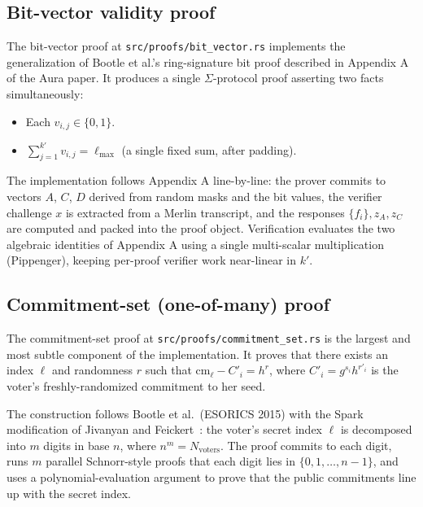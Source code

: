 \documentclass[12pt,a4paper,oneside]{report}
\begin{document}
\subsection{Bit-vector validity proof}
\label{sec:impl-bit-vector}

The bit-vector proof at \texttt{src/proofs/bit\_vector.rs} implements the 
generalization of Bootle et al.'s ring-signature bit proof described in 
Appendix A of the Aura paper. It produces a single $\Sigma$-protocol 
proof asserting two facts simultaneously:

\begin{itemize}
    \item Each $v_{i, j} \in \{0, 1\}$.
    \item $\sum_{j=1}^{k'} v_{i, j} = \ell_{\max}$ (a single fixed sum, 
    after padding).
\end{itemize}

The implementation follows Appendix A line-by-line: the prover commits 
to vectors $A$, $C$, $D$ derived from random masks and the bit values, 
the verifier challenge $x$ is extracted from a Merlin transcript, and 
the responses $\{f_i\}, z_A, z_C$ are computed and packed into the 
proof object. Verification evaluates the two algebraic identities of 
Appendix A using a single multi-scalar multiplication (Pippenger), 
keeping per-proof verifier work near-linear in $k'$.

\subsection{Commitment-set (one-of-many) proof}
\label{sec:impl-commitment-set}

The commitment-set proof at \texttt{src/proofs/commitment\_set.rs} is 
the largest and most subtle component of the implementation. It proves 
that there exists an index $\ell$ and randomness $r$ such that 
$\text{cm}_\ell - C'_i = h^r$, where $C'_i = g^{s_i} h^{r'_i}$ is the 
voter's freshly-randomized commitment to her seed.

The construction follows Bootle et al.\ (ESORICS 2015) with the Spark 
modification of Jivanyan and Feickert~\cite{lelantus-spark}: the voter's 
secret index $\ell$ is decomposed into $m$ digits in base $n$, where 
$n^m = N_{\text{voters}}$. The proof commits to each digit, runs $m$ 
parallel Schnorr-style proofs that each digit lies in $\{0, 1, \ldots, n-1\}$, 
and uses a polynomial-evaluation argument to prove that the public 
commitments line up with the secret index.
\end{document}
